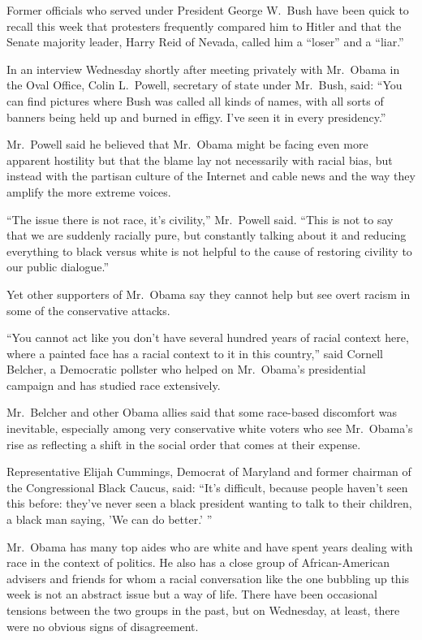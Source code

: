 ﻿\documentclass[12pt]{article}
\begin{document}
Former officials who served under President George W.~Bush have been quick to recall this week that
protesters frequently compared him to Hitler and that the Senate majority leader, Harry Reid of
Nevada, called him a ``loser'' and a ``liar.''

In an interview Wednesday shortly after meeting privately with Mr.~Obama in the Oval Office, Colin
L.~Powell, secretary of state under Mr.~Bush, said: ``You can find pictures where Bush was called
all kinds of names, with all sorts of banners being held up and burned in effigy. I've seen it in
every presidency.''

Mr.~Powell said he believed that Mr.~Obama might be facing even more apparent hostility but that the
blame lay not necessarily with racial bias, but instead with the partisan culture of the Internet
and cable news and the way they amplify the more extreme voices.

``The issue there is not race, it's civility,'' Mr.~Powell said. ``This is not to say that we are
suddenly racially pure, but constantly talking about it and reducing everything to black versus
white is not helpful to the cause of restoring civility to our public dialogue.''

Yet other supporters of Mr.~Obama say they cannot help but see overt racism in some of the
conservative attacks.

``You cannot act like you don't have several hundred years of racial context here, where a painted
face has a racial context to it in this country,'' said Cornell Belcher, a Democratic pollster who
helped on Mr.~Obama's presidential campaign and has studied race extensively.

Mr.~Belcher and other Obama allies said that some race-based discomfort was inevitable, especially
among very conservative white voters who see Mr.~Obama's rise as reflecting a shift in the social
order that comes at their expense.

Representative Elijah Cummings, Democrat of Maryland and former chairman of the Congressional Black
Caucus, said: ``It's difficult, because people haven't seen this before: they've never seen a black
president wanting to talk to their children, a black man saying, 'We can do better.' ''

Mr.~Obama has many top aides who are white and have spent years dealing with race in the context of
politics. He also has a close group of African-American advisers and friends for whom a racial
conversation like the one bubbling up this week is not an abstract issue but a way of life. There
have been occasional tensions between the two groups in the past, but on Wednesday, at least, there
were no obvious signs of disagreement.
\end{document}
